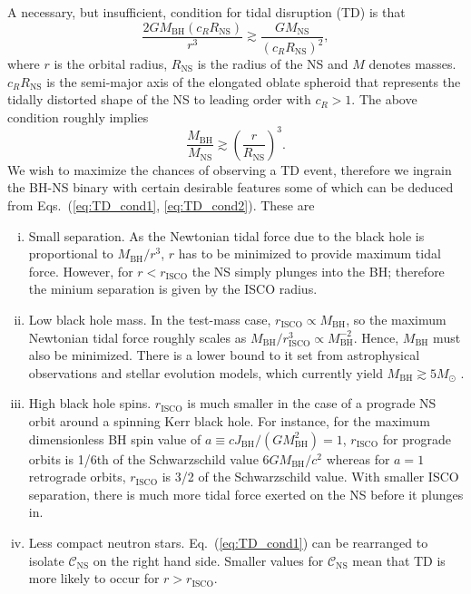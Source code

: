 \documentclass[prd,amsmath,amssymb,aps,floats,amsfonts,notitlepage,superscriptaddress,eqsecnum,nofootinbib,10pt]{revtex4-1}
\newcommand{\f}{\frac}
\newcommand{\be}{\begin{equation}}
\newcommand{\ee}{\end{equation}}
\begin{document}
A necessary, but insufficient, condition for tidal disruption (TD) is that
\be
\f{2 G M_\text{BH} (c_R R_\text{NS})}{r^3} \gtrsim \f{G M_\text{NS}}{(c_R R_\text{NS})^2} \label{eq:TD_cond1},
\ee
where $r$ is the orbital radius, $R_\text{NS}$ is the radius of the NS and $M$ denotes masses. 
$c_R R_\text{NS}$ is the semi-major axis of the elongated oblate spheroid that represents the tidally distorted shape of the NS to leading order with
$c_R >1 $. %
The above condition roughly implies
%
\be
\f{M_\text{BH}}{M_\text{NS}} \gtrsim \left(\f{r}{R_\text{NS}}\right)^3 \label{eq:TD_cond2}.
\ee
%
We wish to maximize the chances of observing a TD event, therefore we ingrain the BH-NS binary with certain desirable features
some of which can be deduced from Eqs.~(\ref{eq:TD_cond1}, \ref{eq:TD_cond2}). These are
%
%
\begin{enumerate}[(i)]
 \item Small separation. As the Newtonian tidal force due to the black hole is proportional to $M_\text{BH}/r^3$, $r$ has to be
 minimized to provide maximum tidal force. 
 However, for $r< r_\text{ISCO}$ the NS simply plunges into the BH; therefore the minium separation is given by the ISCO radius.
 \item Low black hole mass. In the test-mass case, $r_\text{ISCO} \propto M_\text{BH}$, so the maximum Newtonian tidal force roughly scales as $M_\text{BH}/r_\text{ISCO}^3\propto M_\text{BH}^{-2}$. 
 Hence, $M_\text{BH}$ must also be minimized. 
 There is a lower bound to it set from astrophysical observations and stellar evolution models, which currently yield $M_\text{BH} \gtrsim 5 M_\odot$ \cite{Farr:2010tu, Raithel:2017nlc, Ozel:2010su, Wiktorowicz:2013dua, Christian:2018mjv}.
 \item High black hole spins. $r_\text{ISCO}$ is much smaller in the case of a prograde NS orbit around a spinning Kerr black hole.
 For instance, for the maximum dimensionless BH spin value of $a\equiv c J_\text{BH}/(G M^2_\text{BH})=1$, $r_\text{ISCO}$ for prograde orbits is 1/6th of the Schwarzschild value $6GM_\text{BH}/c^2$ whereas for $a=1$ retrograde orbits, $r_\text{ISCO}$ is 3/2 of the Schwarzschild value.
 With smaller ISCO separation, there is much more tidal force exerted on the NS before it plunges in.
 \item Less compact neutron stars. Eq.~(\ref{eq:TD_cond1}) can be rearranged to isolate $\mathcal{C}_\text{NS}$
 on the right hand side. Smaller values for $\mathcal{C}_\text{NS}$ mean that TD is more likely to occur for $r>r_\text{ISCO}$.
\end{enumerate}
%
\end{document}
